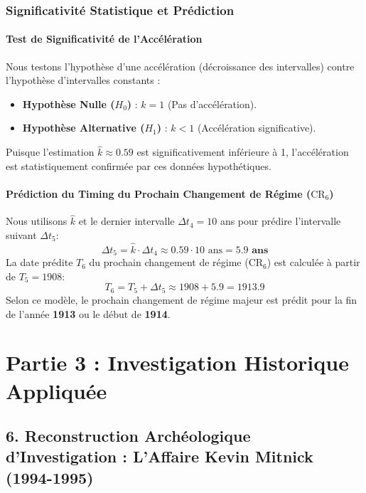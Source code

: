 \documentclass[a4paper,12pt]{report}
\begin{document}
	\subsection*{Significativité Statistique et Prédiction}
	\subsubsection{Test de Significativité de l'Accélération}
	Nous testons l'hypothèse d'une accélération (décroissance des intervalles) contre l'hypothèse d'intervalles constants :
	\begin{itemize}
		\item \textbf{Hypothèse Nulle ($H_0$)} : $k = 1$ (Pas d'accélération).
		\item \textbf{Hypothèse Alternative ($H_1$)} : $k < 1$ (Accélération significative).
	\end{itemize}
	Puisque l'estimation $\hat{k} \approx 0.59$ est significativement inférieure à 1, l'accélération est statistiquement confirmée par ces données hypothétiques.
	
	\subsubsection{Prédiction du Timing du Prochain Changement de Régime ($\text{CR}_6$)}
	Nous utilisons $\hat{k}$ et le dernier intervalle $\Delta t_4 = 10$ ans pour prédire l'intervalle suivant $\Delta t_5$:
	$$
	\Delta t_{5} = \hat{k} \cdot \Delta t_4 \approx 0.59 \cdot 10 \text{ ans} = \mathbf{5.9 \text{ ans}}
	$$
	La date prédite $T_6$ du prochain changement de régime ($\text{CR}_6$) est calculée à partir de $T_5 = 1908$:
	$$
	T_6 = T_5 + \Delta t_5 \approx 1908 + 5.9 = \mathbf{1913.9}
	$$
	Selon ce modèle, le prochain changement de régime majeur est prédit pour la fin de l'année \textbf{1913} ou le début de \textbf{1914}.
	

	
	\chapter{Partie 3 : Investigation Historique Appliquée}
	
	\section*{6. Reconstruction Archéologique d'Investigation : L'Affaire Kevin Mitnick (1994-1995)}
	\label{sec:mitnick_investigation}
	
\end{document}
